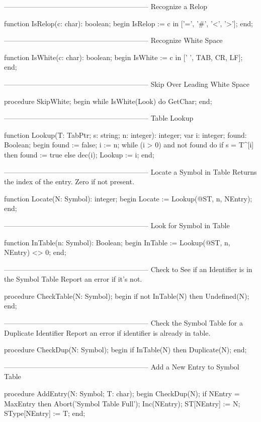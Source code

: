 \documentclass[float=false, crop=false]{standalone}
\begin{document}
\begin{code}
{--------------------------------------------------------------}
{ Recognize a Relop }

function IsRelop(c: char): boolean;
begin
   IsRelop := c in ['=', '#', '<', '>'];
end;


{--------------------------------------------------------------}
{ Recognize White Space }

function IsWhite(c: char): boolean;
begin
   IsWhite := c in [' ', TAB, CR, LF];
end;


{--------------------------------------------------------------}
{ Skip Over Leading White Space }

procedure SkipWhite;
begin
   while IsWhite(Look) do
      GetChar;
end;


{--------------------------------------------------------------}
{ Table Lookup }

function Lookup(T: TabPtr; s: string; n: integer): integer;
var i: integer;
    found: Boolean;
begin
   found := false;
   i := n;
   while (i > 0) and not found do
      if s = T^[i] then
         found := true
      else
         dec(i);
   Lookup := i;
end;


{--------------------------------------------------------------}
{ Locate a Symbol in Table }
{ Returns the index of the entry.  Zero if not present. }

function Locate(N: Symbol): integer;
begin
   Locate := Lookup(@ST, n, NEntry);
end;


{--------------------------------------------------------------}
{ Look for Symbol in Table }

function InTable(n: Symbol): Boolean;
begin
   InTable := Lookup(@ST, n, NEntry) <> 0;
end;


{--------------------------------------------------------------}
{ Check to See if an Identifier is in the Symbol Table         }
{ Report an error if it's not. }


procedure CheckTable(N: Symbol);
begin
   if not InTable(N) then Undefined(N);
end;


{--------------------------------------------------------------}
{ Check the Symbol Table for a Duplicate Identifier }
{ Report an error if identifier is already in table. }


procedure CheckDup(N: Symbol);
begin
   if InTable(N) then Duplicate(N);
end;


{--------------------------------------------------------------}
{ Add a New Entry to Symbol Table }

procedure AddEntry(N: Symbol; T: char);
begin
   CheckDup(N);
   if NEntry = MaxEntry then Abort('Symbol Table Full');
   Inc(NEntry);
   ST[NEntry] := N;
   SType[NEntry] := T;
end;



\end{code}
\end{document}
